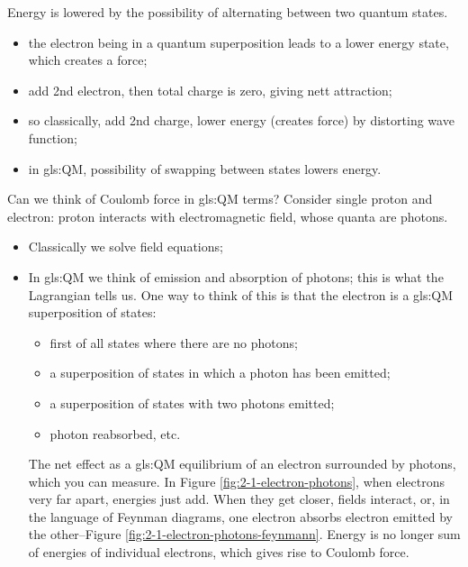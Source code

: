 \documentclass[]{article}
\begin{document}
Energy is lowered by the possibility of alternating between two quantum states.

\begin{itemize}
	\item the electron being in a quantum superposition leads to a lower energy state, which creates a force;
	
	\item add 2nd electron, then total charge is zero, giving nett attraction; 

	\item so classically, add 2nd charge, lower energy (creates force) by distorting wave function;
	\item in \gls{gls:QM}, possibility of swapping between states lowers energy.
\end{itemize}
Can we think of Coulomb force in \gls{gls:QM} terms? Consider single proton and electron: proton interacts with electromagnetic field, whose quanta are photons.

\begin{itemize}
	\item Classically we solve field equations;
	\item In \gls{gls:QM} we think of emission and absorption of photons; this is what the Lagrangian tells us. One way to think of this is that the electron is a \gls{gls:QM} superposition of states:
	\begin{itemize}
		\item first of all states where there are no photons;
		\item a superposition of states in which a photon has been emitted;
		\item a superposition of states  with two photons emitted;
		\item photon reabsorbed, etc.
	\end{itemize}
	The net effect as a \gls{gls:QM} equilibrium of an electron surrounded by photons, which you can measure.
	 In Figure \ref{fig:2-1-electron-photons}, when electrons very far apart, energies just add. When they get closer, fields interact, or, in the language of Feynman diagrams, one electron absorbs electron emitted by the other--Figure \ref{fig:2-1-electron-photons-feynmann}.  Energy is no longer sum of energies of individual electrons, which gives rise to Coulomb force.
\end{itemize}
\end{document}
